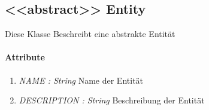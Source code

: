 \subsection{<{<{abstract}>}> Entity}
Diese Klasse Beschreibt eine abstrakte Entität 

\paragraph{Attribute}
\begin{enumerate}[$\bullet$]
	\item \textit{NAME : String} Name der Entität
	\item \textit{DESCRIPTION : String} Beschreibung der Entität
\end{enumerate}

